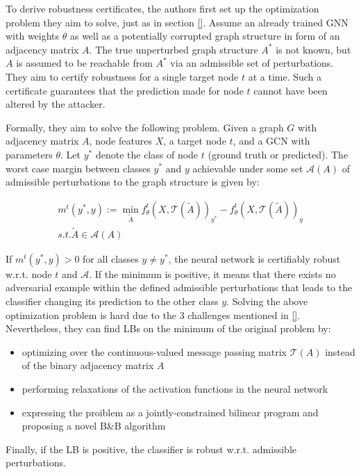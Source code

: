 \documentclass[a4paper,preprint]{sig-alternate}
\begin{document}
To derive robustness certificates, the authors first set up the optimization problem they aim to solve, just
as in section \ref{}. Assume an already trained GNN with weights $\theta$ as well as a potentially corrupted graph
structure in form of an adjacency matrix $A$. The true unperturbed graph structure $A^{\ast}$ is not known, but $A$ is
assumed to be reachable from $A^{\ast}$ via an admissible set of perturbations. They aim to certify robustness for a
single target node $t$ at a time. Such a certificate guarantees that the prediction made for node $t$ cannot have been
altered by the attacker.\newline

Formally, they aim to solve the following problem.\newline
Given a graph $G$ with adjacency matrix $A$, node features $X$, a target node $t$, and a GCN with parameters $\theta$. Let $y^{\ast}$
denote the class of node $t$ (ground truth or predicted). The worst case margin between classes $y^{\ast}$ and $y$
achievable under some set $\mathcal{A}(A)$ of admissible perturbations to the graph structure is given by:

\begin{gather}
    m^t (y^{\ast}, y) := \min_{\tilde{A}} f_{\theta}^t (X, \mathcal{T}(\tilde{A}))_{y^{\ast}}
    - f_{\theta}^t (X, \mathcal{T}(\tilde{A}))_y \\
    s.t. \tilde{A} \in \mathcal{A}(A)
\end{gather}

If $m^t (y^{\ast}, y) > 0$ for all classes $y \neq y^{\ast}$, the neural network is certifiably robust w.r.t. node $t$
and $\mathcal{A}$. If the minimum is positive, it means that there exists no adversarial example within the defined
admissible perturbations that leads to the classifier changing its prediction to the other class $y$.
Solving the above optimization problem is hard due to the $3$ challenges mentioned in \ref{}.
Nevertheless, they can find LBs on the minimum of the original problem by:
\begin{itemize}
    \item optimizing over the continuous-valued message passing matrix $\mathcal{T}(A)$ instead of the binary
    adjacency matrix $A$
    \item performing relaxations of the activation functions in the neural network
    \item expressing the proiblem as a jointly-constrained bilinear program and proposing a novel B\&B algorithm
\end{itemize}
Finally, if the LB is positive, the classifier is robust w.r.t. admissible perturbations.
\end{document}

